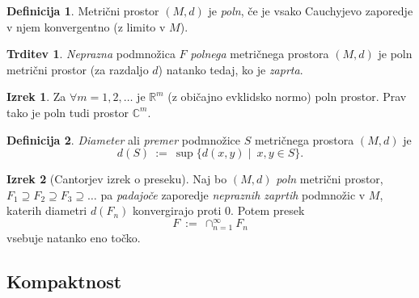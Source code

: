 \documentclass[11pt]{article}
\theoremstyle{definition}
\newtheorem{definicija}{Definicija}[section]
\theoremstyle{definition}
\newtheorem{trditev}{Trditev}[section]
\theoremstyle{definition}
\newtheorem{izrek}{Izrek}[section]
\begin{document}
\begin{definicija}

Metrični prostor $(M, d)$ je \textit{poln}, če je vsako Cauchyjevo zaporedje v njem konvergentno (z limito v $M$).

\end{definicija}
\vspace{0.5cm}

\begin{trditev}

\textit{Neprazna} podmnožica $F$ \textit{polnega} metričnega prostora $(M, d)$ je poln metrični prostor (za razdaljo $d$) natanko tedaj, ko je \textit{zaprta}.

\end{trditev}
\vspace{0.5cm}

\begin{izrek}

Za $\forall m  = 1, 2, \ldots$ je $\mathbb{R}^m$ (z običajno evklidsko normo) poln prostor. Prav tako je poln tudi prostor $\mathbb{C}^m$.

\end{izrek}
\vspace{0.5cm}

\begin{definicija}

\textit{Diameter} ali \textit{premer} podmnožice $S$ metričnega prostora $(M, d)$ je 
$$d(S) ~:=~ \sup{\{d(x,y) \mid ~x, y \in S\}}.$$

\end{definicija}
\vspace{0.5cm}

\begin{izrek}[Cantorjev izrek o preseku]

Naj bo $(M, d)$ \textit{poln} metrični prostor, $F_1 \supseteq F_2 \supseteq F_3 \supseteq \ldots$ pa \textit{padajoče} zaporedje \textit{nepraznih zaprtih} podmnožic v $M$, katerih diametri $d(F_n)$ konvergirajo proti $0$. Potem presek 
$$F ~:=~ \cap_{n=1}^{\infty} F_n$$
vsebuje natanko eno točko.

\end{izrek}
\vspace{0.5cm}


\subsection{Kompaktnost}
\vspace{0.5cm}
\end{document}

